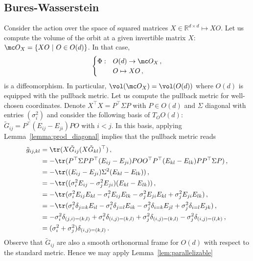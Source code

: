 \documentclass[twoside,a4paper,11pt]{article}
\theoremstyle{plain}
\begin{document}
\subsection{Bures-Wasserstein}

Consider the action over the space of squared matrices $X \in \mathbb{R}^{d\times d} \mapsto XO$. Let us compute the volume of the orbit at a given invertible matrix $X$:  $\mc O_X = \{XO ~ | ~ O \in O(d)\} $. In that case, 
\begin{equation*}
    \begin{cases}
     \Phi : & O(d) \to \mc O_X \, , \\
       & O \mapsto XO \, ,
    \end{cases}
\end{equation*}
is a diffeomorphism. In particular, $\vol(\mc O_X) = \vol(O(d))$ where $O(d)$ is equipped with the pullback metric. Let us compute the pullback metric for well-chosen coordinates. Denote $X^\top X = P^\top \Sigma P$ with $P \in O(d)$ and $\Sigma$ diagonal with entries $(\sigma_i^2)$ and consider the following basis of $T_O O(d)$: $\tilde{G}_{ij} = P^\top(E_{ij} - E_{ji})P O$ with $i<j$. In this basis,
applying Lemma~\ref{lemma:prod_diagonal}
implies that the pullback metric reads
\begin{align*}
    \tilde{g}_{ij, kl} & = \tr(X\tilde{G}_{ij} (X\tilde{G}_{kl})^\top) \, ,\\
    & = -\tr(P^\top \Sigma PP^\top(E_{ij} - E_{ji})P O O^\top P^\top(E_{kl} - E_{lk})PP^\top \Sigma P) \, , \\
    & = -\tr((E_{ij} - E_{ji}) \Sigma^2 (E_{kl} - E_{lk})) \, , \\
    & = -\tr((\sigma_i^2E_{ij} - \sigma_j^2 E_{ji})(E_{kl} - E_{lk})) \, , \\
    & = -\tr(\sigma_i^2E_{ij} E_{kl} - \sigma_i^2E_{ij}E_{lk} - \sigma_j^2 E_{ji}E_{kl} +  \sigma_j^2 E_{ji}E_{lk}) \, , \\
    & = -\tr(\sigma_i^2 \delta_{j=k} E_{il} - \sigma_i^2 \delta_{j=l}E_{ik} - \sigma_j^2 \delta_{i=k} E_{jl} + \sigma_j^2 \delta_{i=l}E_{jk}) \, ,\\
    & = - \sigma_i^2 \delta_{(j,i)=(k,l)} + \sigma_i^2 \delta_{(i,j)=(k,l)} + \sigma_j^2 \delta_{(i, j)=(k,l)} -  \sigma_j^2 \delta_{(i, j)=(l,k)} \, , \\
    & = (\sigma_i^2 + \sigma_j^2)\delta_{(i,j)=(k,l)} \, .
\end{align*}
Observe that $\tilde G_{ij}$ are
also a smooth orthonormal frame for $O(d)$
with respect to the standard metric.
Hence we may apply Lemma~\ref{lem:parallelizable}
\end{document}
